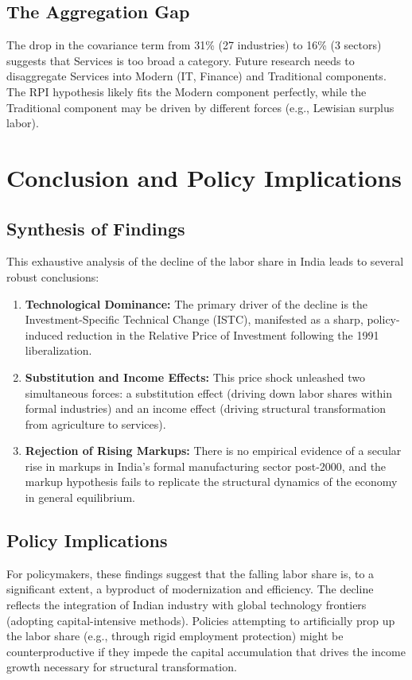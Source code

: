 \documentclass[12pt]{article}
\begin{document}
\subsection{The Aggregation Gap}
The drop in the covariance term from 31\% (27 industries) to 16\% (3 sectors) suggests that Services is too broad a category. Future research needs to disaggregate Services into Modern (IT, Finance) and Traditional components. The RPI hypothesis likely fits the Modern component perfectly, while the Traditional component may be driven by different forces (e.g., Lewisian surplus labor).

\newpage
\section{Conclusion and Policy Implications}

\subsection{Synthesis of Findings}
This exhaustive analysis of the decline of the labor share in India leads to several robust conclusions:
\begin{enumerate}[leftmargin=*,itemsep=4pt]
\item \textbf{Technological Dominance:} The primary driver of the decline is the Investment-Specific Technical Change (ISTC), manifested as a sharp, policy-induced reduction in the Relative Price of Investment following the 1991 liberalization.
\item \textbf{Substitution and Income Effects:} This price shock unleashed two simultaneous forces: a substitution effect (driving down labor shares within formal industries) and an income effect (driving structural transformation from agriculture to services).
\item \textbf{Rejection of Rising Markups:} There is no empirical evidence of a secular rise in markups in India's formal manufacturing sector post-2000, and the markup hypothesis fails to replicate the structural dynamics of the economy in general equilibrium.
\end{enumerate}

\subsection{Policy Implications}
For policymakers, these findings suggest that the falling labor share is, to a significant extent, a byproduct of modernization and efficiency. The decline reflects the integration of Indian industry with global technology frontiers (adopting capital-intensive methods). Policies attempting to artificially prop up the labor share (e.g., through rigid employment protection) might be counterproductive if they impede the capital accumulation that drives the income growth necessary for structural transformation.
\end{document}
